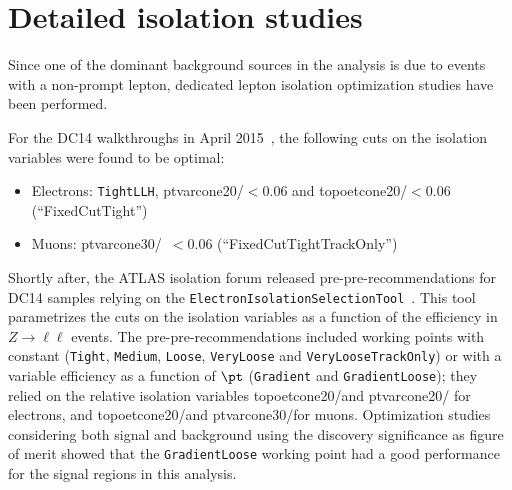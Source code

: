 \section{Detailed isolation studies}
\label{app:iso}
Since one of the dominant background sources in the analysis is due to events with a non-prompt lepton, 
dedicated lepton isolation optimization studies have been performed.

For the DC14 walkthroughs in April 2015~\cite{NoteDC14}, the following cuts on the isolation variables were found 
to be optimal:
\begin{itemize}
\item Electrons: {\tt TightLLH}, ptvarcone20/\pt$<$0.06 and topoetcone20/\pt$<$0.06 (``FixedCutTight'')
\item Muons: ptvarcone30/\pt\ $<0.06$ (``FixedCutTightTrackOnly'')
\end{itemize}

Shortly after, the ATLAS isolation forum released pre-pre-recommendations for DC14 samples relying on the 
{\tt ElectronIsolationSelectionTool}~\cite{ElectronIso_twiki}. This tool parametrizes the cuts on the isolation variables 
as a function of the efficiency in $Z\to\ell\ell$ events.
The pre-pre-recommendations included working points with constant ({\tt Tight}, {\tt Medium}, {\tt Loose}, 
{\tt VeryLoose} and {\tt VeryLooseTrackOnly}) or with a variable efficiency as a function of $\pt$ ({\tt Gradient} and {\tt GradientLoose});
they relied on the relative isolation variables topoetcone20/\pt and ptvarcone20/\pt 
for electrons, and topoetcone20/\pt and ptvarcone30/\pt for muons. 
Optimization studies considering both signal and background using the discovery significance as figure of merit showed that the {\tt GradientLoose} working point had a good performance for the signal regions in this analysis.



